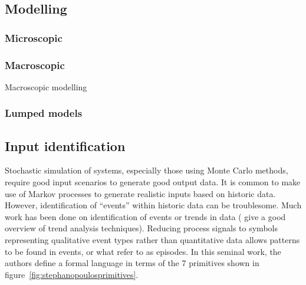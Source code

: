 \subsection{Modelling}
\subsubsection{Microscopic}

\subsubsection{Macroscopic}
Macroscopic modelling 

\subsubsection{Lumped models}

\subsection{Input identification}
Stochastic simulation of systems, especially those using Monte Carlo
methods, require good input scenarios to generate good output data.
It is common to make use of Markov processes to generate realistic
inputs based on historic data.  However, identification of ``events''
within historic data can be troublesome.  Much work has been done on
identification of events or trends in data (\citet{maurya.rengaswamy.ea2007fault}
give a good overview of trend analysis techniques).  Reducing process
signals to symbols representing qualitative event types rather than
quantitative data allows patterns to be found in events, or what
\citet{Cheung1990Representation} refer to as
episodes.  In this seminal work, the authors define a formal language
in terms of the 7 primitives shown in
figure~\ref{fig:stephanopoulosprimitives}.

